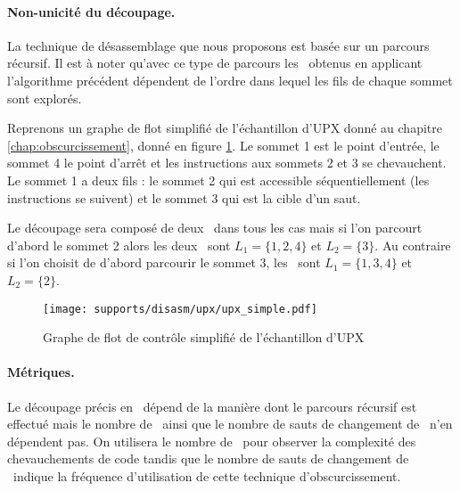 \paragraph{Non-unicité du découpage.}
La technique de désassemblage que nous proposons est basée sur un parcours récursif. Il est à noter qu'avec ce type de parcours les \layers\ obtenus en applicant l'algorithme précédent dépendent de l'ordre dans lequel les fils de chaque sommet sont explorés.

Reprenons un graphe de flot simplifié de l'échantillon d'UPX donné au chapitre \ref{chap:obscurcissement}, donné en figure \ref{fig:upx_cfg_simple}. Le sommet 1 est le point d'entrée, le sommet 4 le point d'arrêt et les instructions aux sommets 2 et 3 se chevauchent. Le sommet 1 a deux fils : le sommet 2 qui est accessible séquentiellement (les instructions se suivent) et le sommet 3 qui est la cible d'un saut.

Le découpage sera composé de deux \layers\ dans tous les cas mais si l'on parcourt d'abord le sommet 2 alors les deux \layers\ sont $L_1=\{1, 2, 4\}$ et $L_2=\{3\}$. Au contraire si l'on choisit de d'abord parcourir le sommet 3, les \layers\ sont $L_1=\{1, 3, 4\}$ et $L_2=\{2\}$.

\begin{figure}
\begin{center}
\texttt{[image: supports/disasm/upx/upx\_simple.pdf]}
\end{center}
\caption{Graphe de flot de contrôle simplifié de l'échantillon d'UPX}
\label{fig:upx_cfg_simple}
\end{figure}

\paragraph{Métriques.}
Le découpage précis en \layers\ dépend de la manière dont le parcours récursif est effectué mais  le nombre de \layers\ ainsi que le nombre de sauts de changement de \layers\ n'en dépendent pas.
On utilisera le nombre de \layers\ pour observer la complexité des chevauchements de code tandis que le nombre de sauts de changement de \layers\ indique la fréquence d'utilisation de cette technique d'obscurcissement.


